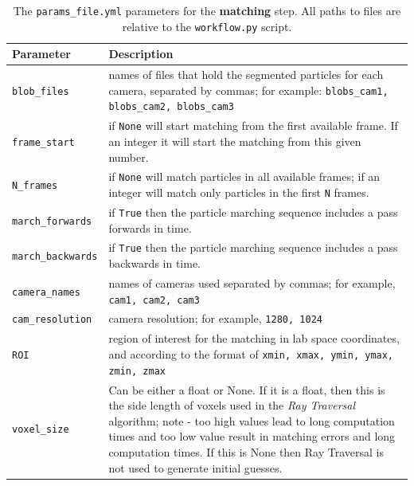 \documentclass[10pt,a4paper]{article}
\begin{document}
\begin{table}[!ht]
	\centering
	\caption{The \texttt{params\_file.yml} parameters for the \textbf{matching} step. All paths to files are relative to the \texttt{workflow.py} script.}
	\begin{tabular}{l m{10cm}}
		\hline
		Parameter & Description\\
		\hline
		
		\texttt{blob\_files} & names of files that hold the segmented particles for each camera, separated by commas; for example: \texttt{blobs\_cam1, blobs\_cam2, blobs\_cam3} \\
		
		\texttt{frame\_start} & if \texttt{None} will start matching from the first available frame. If an integer it will start the matching from this given number. \\
		
		\texttt{N\_frames} & if \texttt{None} will match particles in all available frames; if an integer will match only particles in the first \texttt{N} frames. \\
		
		\texttt{march\_forwards} & if \texttt{True} then the particle marching sequence includes a pass forwards in time. \\
		
		\texttt{march\_backwards} & if \texttt{True} then the particle marching sequence includes a pass backwards in time. \\
		
		\texttt{camera\_names} & names of cameras used separated by commas; for example, \texttt{cam1, cam2, cam3} \\
		
		\texttt{cam\_resolution} & camera resolution; for example, \texttt{1280, 1024} \\
		
		\texttt{ROI} & region of interest for the matching in lab space coordinates, and according to the format of \texttt{xmin, xmax, ymin, ymax, zmin, zmax} \\
		
		\texttt{voxel\_size} & Can be either a float or None. If it is a float, then this is the side length of voxels used in the \textit{Ray Traversal} algorithm; note - too high values lead to long computation times and too low value result in matching errors and long computation times. If this is None then Ray Traversal is not used to generate initial guesses. \\
		

\end{tabular}
\end{table}
\end{document}
